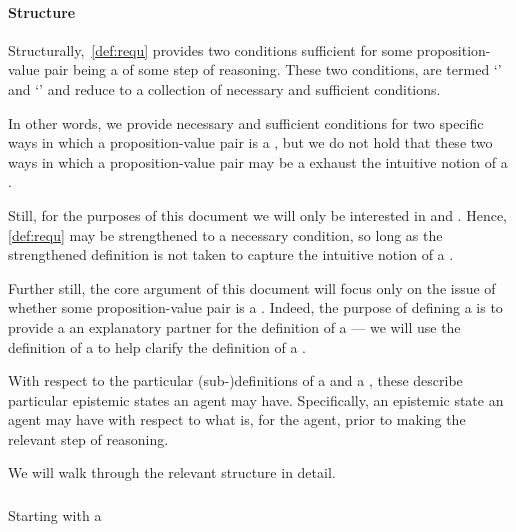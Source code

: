 \paragraph{Structure}

\begin{note}
  Structurally,~\autoref{def:requ} provides two conditions sufficient for some proposition-value pair being a \requ{} of some step of reasoning.
  These two conditions, are termed `\prequ{}' and `\crequ{}' and reduce to a collection of necessary and sufficient conditions.

  In other words, we provide necessary and sufficient conditions for two specific ways in which a proposition-value pair is a \requ{}, but we do not hold that these two ways in which a proposition-value pair may be a \requ{} exhaust the intuitive notion of a \requ{}.

  Still, for the purposes of this document we will only be interested in  and .
  Hence, \autoref{def:requ} may be strengthened to a necessary condition, so long as the strengthened definition is not taken to capture the intuitive notion of a \requ{}.

  Further still, the core argument of this document will focus only on the issue of whether some proposition-value pair is a .
  Indeed, the purpose of defining a \prequ{} is to provide a an explanatory partner for the definition of a \crequ{} --- we will use the definition of a \prequ{} to help clarify the definition of a \crequ{}.
\end{note}

\begin{note}
  With respect to the particular (sub-)definitions of a \prequ{} and a \crequ{}, these describe particular epistemic states an agent may have.
  Specifically, an epistemic state an agent may have with respect to what is, for the agent, \epVAd{} prior to making the relevant step of reasoning.

  We will walk through the relevant structure in detail.
\end{note}

\subparagraph{}

\begin{note}
  Starting with a \prequ{}
\end{note}

